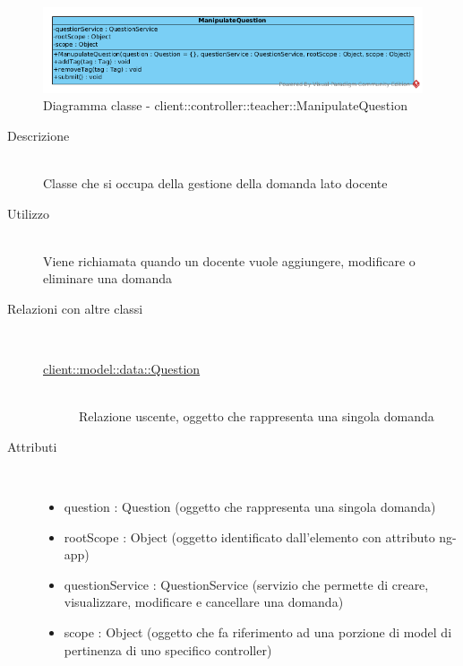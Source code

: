 \vspace{0.5cm}
\hypertarget{client::controller::teacher::ManipulateQuestion}{}
\begin{center}
			\begin{figure}[H]
				\centering \includegraphics[scale=4, max width=\textwidth, max height=\myheight]{../img/diagrammiClassi/client/controller/teacher/ManipulateQuestion.png}
				\caption{Diagramma classe - client::controller::teacher::ManipulateQuestion}
			\end{figure}
		\end{center}\begin{description}
\item[Descrizione] \hfill \\
 Classe che si occupa della gestione della domanda lato docente
\item[Utilizzo] \hfill \\
 Viene richiamata quando un docente vuole aggiungere,  modificare o eliminare una domanda
\item[Relazioni con altre classi] \hfill \\
 \vspace{-7mm}
\begin{description}
\item[\hyperlink{client::model::data::Question}{client::model::data::Question}] \hfill \\
 Relazione uscente, oggetto che rappresenta una singola domanda
\end{description}

\item[Attributi] \hfill \\
 \vspace{-7mm}
\begin{itemize}
\item question : Question  (oggetto che rappresenta una singola domanda)
\item rootScope : Object (oggetto identificato dall’elemento con attributo ng-app)
\item questionService : QuestionService (servizio che permette di creare, visualizzare, modificare e cancellare una domanda)
\item scope : Object (oggetto che fa riferimento ad una porzione di model di pertinenza di uno specifico controller)
\end{itemize}


\end{description}
